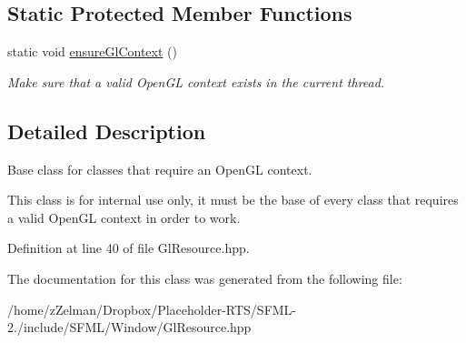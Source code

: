 \subsection*{Static Protected Member Functions}
\begin{DoxyCompactItemize}
\item 
\hypertarget{classsf_1_1GlResource_ae0efa7935241644608ca32ba47b22a33}{static void \hyperlink{classsf_1_1GlResource_ae0efa7935241644608ca32ba47b22a33}{ensure\-Gl\-Context} ()}\label{classsf_1_1GlResource_ae0efa7935241644608ca32ba47b22a33}

\begin{DoxyCompactList}\small\item\em Make sure that a valid Open\-G\-L context exists in the current thread. \end{DoxyCompactList}\end{DoxyCompactItemize}


\subsection{Detailed Description}
Base class for classes that require an Open\-G\-L context. 

This class is for internal use only, it must be the base of every class that requires a valid Open\-G\-L context in order to work. 

Definition at line 40 of file Gl\-Resource.\-hpp.



The documentation for this class was generated from the following file\-:\begin{DoxyCompactItemize}
\item 
/home/z\-Zelman/\-Dropbox/\-Placeholder-\/\-R\-T\-S/\-S\-F\-M\-L-\/2./include/\-S\-F\-M\-L/\-Window/Gl\-Resource.\-hpp\end{DoxyCompactItemize}
